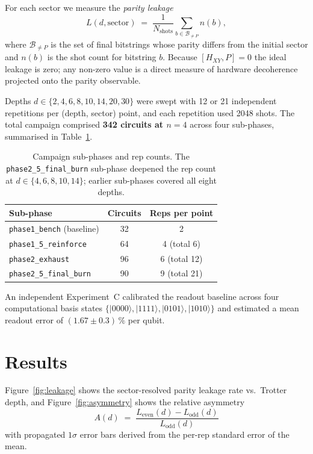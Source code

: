 \documentclass[reprint,aps,physrev,superscriptaddress,floatfix,longbibliography]{revtex4-2}
\begin{document}
For each sector we measure the \emph{parity leakage}
%
\begin{equation}\label{eq:leakage}
  L(d, \text{sector}) \;=\;
    \frac{1}{N_\text{shots}}
    \sum_{b \in \mathcal{B}_{\neq P}} n(b),
\end{equation}
%
where $\mathcal{B}_{\neq P}$ is the set of final bitstrings whose
parity differs from the initial sector and $n(b)$ is the shot count
for bitstring $b$. Because $[H_{XY}, P] = 0$ the ideal leakage is
zero; any non-zero value is a direct measure of hardware decoherence
projected onto the parity observable.

Depths $d \in \{2, 4, 6, 8, 10, 14, 20, 30\}$ were swept with
12 or 21 independent repetitions per (depth, sector) point, and each
repetition used 2048 shots. The total campaign comprised
\textbf{342 circuits at $n = 4$} across four sub-phases, summarised in
Table~\ref{tab:subphases}.

\begin{table}[tb]
\centering
\begin{tabular}{lcc}
\toprule
Sub-phase & Circuits & Reps per point \\
\midrule
\texttt{phase1\_bench} (baseline) & 32 & 2 \\
\texttt{phase1\_5\_reinforce} & 64 & 4 (total 6) \\
\texttt{phase2\_exhaust} & 96 & 6 (total 12) \\
\texttt{phase2\_5\_final\_burn} & 90 & 9 (total 21) \\
\bottomrule
\end{tabular}
\caption{Campaign sub-phases and rep counts. The
\texttt{phase2\_5\_final\_burn} sub-phase deepened the rep count at
$d \in \{4, 6, 8, 10, 14\}$; earlier sub-phases covered all eight
depths.}
\label{tab:subphases}
\end{table}

An independent Experiment~C calibrated the readout baseline across
four computational basis states
$\{|0000\rangle, |1111\rangle, |0101\rangle, |1010\rangle\}$ and
estimated a mean readout error of $(1.67 \pm 0.3)\,\%$ per qubit.

\section{Results}
\label{sec:results}

Figure~\ref{fig:leakage} shows the sector-resolved parity leakage
rate vs.\ Trotter depth, and Figure~\ref{fig:asymmetry} shows the
relative asymmetry
%
\begin{equation}\label{eq:asymmetry}
  A(d) \;=\;
    \frac{L_\text{even}(d) - L_\text{odd}(d)}{L_\text{odd}(d)}
\end{equation}
%
with propagated $1\sigma$ error bars derived from the per-rep
standard error of the mean.
\end{document}
